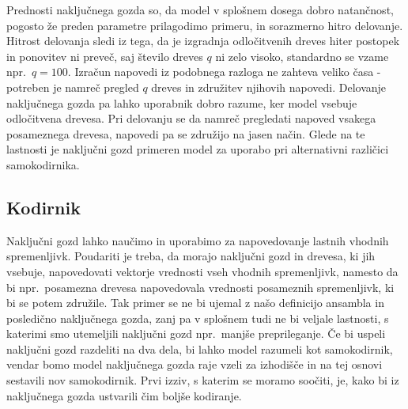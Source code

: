 \documentclass[12pt,a4paper]{article}
\begin{document}


Prednosti naključnega gozda so, da model v splošnem dosega dobro natančnost, pogosto že preden parametre prilagodimo primeru, in sorazmerno hitro delovanje. 
Hitrost delovanja sledi iz tega, da je izgradnja odločitvenih dreves hiter postopek in ponovitev ni preveč, saj število dreves $q$ ni zelo visoko, standardno se vzame npr.\ $q = 100$. 
Izračun napovedi iz podobnega razloga ne zahteva veliko časa - potreben je namreč pregled $q$ dreves in združitev njihovih napovedi. 
Delovanje naključnega gozda pa lahko uporabnik dobro razume, ker model vsebuje odločitvena drevesa. 
Pri delovanju se da namreč pregledati napoved vsakega posameznega drevesa, napovedi pa se združijo na jasen način. 
Glede na te lastnosti je naključni gozd primeren model za uporabo pri alternativni različici samokodirnika.



\subsection{Kodirnik}

Naključni gozd lahko naučimo in uporabimo za napovedovanje lastnih vhodnih spremenljivk. 
Poudariti je treba, da morajo naključni gozd in drevesa, ki jih vsebuje, napovedovati vektorje vrednosti vseh vhodnih spremenljivk, namesto da bi npr.\ 
posamezna drevesa napovedovala vrednosti posameznih spremenljivk, ki bi se potem združile. 
Tak primer se ne bi ujemal z našo definicijo ansambla in posledično naključnega gozda, zanj pa v splošnem tudi ne bi veljale lastnosti, s katerimi smo utemeljili naključni gozd npr.\ manjše preprileganje. 
Če bi uspeli naključni gozd razdeliti na dva dela, bi lahko model razumeli kot samokodirnik, vendar bomo model naključnega gozda raje vzeli za izhodišče in na tej osnovi sestavili nov samokodirnik. 
Prvi izziv, s katerim se moramo soočiti, je, kako bi iz naključnega gozda ustvarili čim boljše kodiranje.
\end{document}
